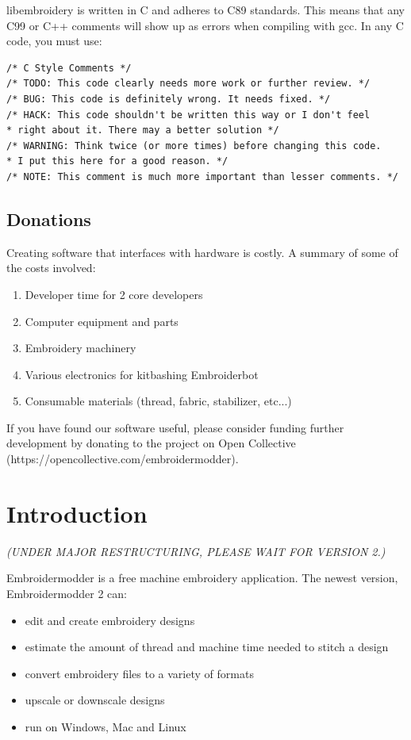 \documentclass[10pt]{report}
\begin{document}
libembroidery is written in C and adheres to C89 standards. This means
that any C99 or C++ comments will show up as errors when compiling with
gcc. In any C code, you must use:

\begin{lstlisting}
/* C Style Comments */
/* TODO: This code clearly needs more work or further review. */
/* BUG: This code is definitely wrong. It needs fixed. */
/* HACK: This code shouldn't be written this way or I don't feel
* right about it. There may a better solution */
/* WARNING: Think twice (or more times) before changing this code.
* I put this here for a good reason. */
/* NOTE: This comment is much more important than lesser comments. */
\end{lstlisting}

\subsection{Donations}

Creating software that interfaces with hardware is costly. A summary
of some of the costs involved:

\begin{enumerate}
\item Developer time for 2 core developers
\item Computer equipment and parts
\item Embroidery machinery
\item Various electronics for kitbashing Embroiderbot
\item Consumable materials (thread, fabric, stabilizer, etc...)
\end{enumerate}

If you have found our software useful, please consider funding further
development by donating to the project on Open Collective
(https://opencollective.com/embroidermodder).

\section{Introduction}

\emph{(UNDER MAJOR RESTRUCTURING, PLEASE WAIT FOR VERSION 2.)}

Embroidermodder is a free machine embroidery application.
The newest version, Embroidermodder 2 can:

\begin{itemize}
\item edit and create embroidery designs
\item estimate the amount of thread and machine time needed to stitch a design
\item convert embroidery files to a variety of formats
\item upscale or downscale designs
\item run on Windows, Mac and Linux
\end{itemize}
\end{document}
